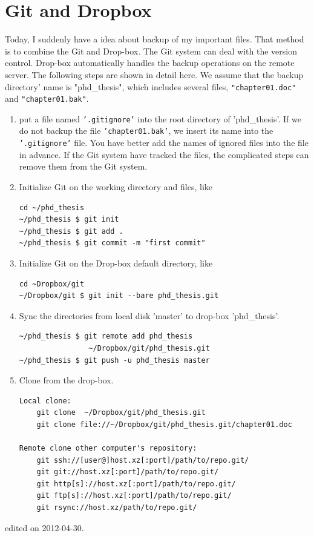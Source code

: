 \section{Git and Dropbox}
Today, I suddenly have a idea about backup of my important files. That method is to combine the Git and Drop-box. The Git system can deal with the version control. Drop-box automatically handles the backup operations on the remote server. The following steps are shown in detail here. We assume that the backup directory' name is "phd\_thesis", which includes several files, \texttt{"chapter01.doc"} and \texttt{"chapter01.bak"}. 
\begin{enumerate}
\item put a file named \texttt{'.gitignore'} into the root directory of 'phd\_thesis'. If we do not backup the file \texttt{'chapter01.bak'}, we insert its name into the \texttt{'.gitignore'} file. You have better add the names of ignored files into the file in advance. If the Git system have tracked the files, the complicated steps can remove them from the Git system.
\item Initialize Git on the working directory and files, like 
\begin{verbatim}
cd ~/phd_thesis
~/phd_thesis $ git init
~/phd_thesis $ git add .
~/phd_thesis $ git commit -m "first commit"
\end{verbatim}
\item Initialize Git on the Drop-box default directory, like
\begin{verbatim}
cd ~Dropbox/git
~/Dropbox/git $ git init --bare phd_thesis.git
\end{verbatim}
\item Sync the directories from local disk 'master' to drop-box 'phd\_thesis'.
\begin{verbatim}
~/phd_thesis $ git remote add phd_thesis 
                ~/Dropbox/git/phd_thesis.git
~/phd_thesis $ git push -u phd_thesis master
\end{verbatim}
\item Clone from the drop-box. 
\begin{verbatim}
Local clone:
    git clone  ~/Dropbox/git/phd_thesis.git
    git clone file://~/Dropbox/git/phd_thesis.git/chapter01.doc

Remote clone other computer's repository:
    git ssh://[user@]host.xz[:port]/path/to/repo.git/
    git git://host.xz[:port]/path/to/repo.git/
    git http[s]://host.xz[:port]/path/to/repo.git/
    git ftp[s]://host.xz[:port]/path/to/repo.git/
    git rsync://host.xz/path/to/repo.git/
\end{verbatim}
\end{enumerate}

\hfill {\tiny edited on 2012-04-30.}

